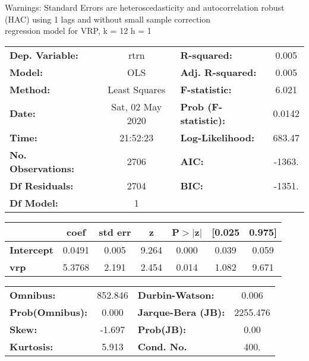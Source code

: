 Warnings: \newline
 [1] Standard Errors are heteroscedasticity and autocorrelation robust (HAC) using 1 lags and without small sample correction\\ 

regression model for VRP, k = 12 h = 1\begin{center}
\begin{tabular}{lclc}
\toprule
\textbf{Dep. Variable:}    &       rtrn       & \textbf{  R-squared:         } &     0.005   \\
\textbf{Model:}            &       OLS        & \textbf{  Adj. R-squared:    } &     0.005   \\
\textbf{Method:}           &  Least Squares   & \textbf{  F-statistic:       } &     6.021   \\
\textbf{Date:}             & Sat, 02 May 2020 & \textbf{  Prob (F-statistic):} &   0.0142    \\
\textbf{Time:}             &     21:52:23     & \textbf{  Log-Likelihood:    } &    683.47   \\
\textbf{No. Observations:} &        2706      & \textbf{  AIC:               } &    -1363.   \\
\textbf{Df Residuals:}     &        2704      & \textbf{  BIC:               } &    -1351.   \\
\textbf{Df Model:}         &           1      & \textbf{                     } &             \\
\bottomrule
\end{tabular}
\begin{tabular}{lcccccc}
                   & \textbf{coef} & \textbf{std err} & \textbf{z} & \textbf{P$> |$z$|$} & \textbf{[0.025} & \textbf{0.975]}  \\
\midrule
\textbf{Intercept} &       0.0491  &        0.005     &     9.264  &         0.000        &        0.039    &        0.059     \\
\textbf{vrp}       &       5.3768  &        2.191     &     2.454  &         0.014        &        1.082    &        9.671     \\
\bottomrule
\end{tabular}
\begin{tabular}{lclc}
\textbf{Omnibus:}       & 852.846 & \textbf{  Durbin-Watson:     } &    0.006  \\
\textbf{Prob(Omnibus):} &   0.000 & \textbf{  Jarque-Bera (JB):  } & 2255.476  \\
\textbf{Skew:}          &  -1.697 & \textbf{  Prob(JB):          } &     0.00  \\
\textbf{Kurtosis:}      &   5.913 & \textbf{  Cond. No.          } &     400.  \\
\bottomrule
\end{tabular}
\end{center}

